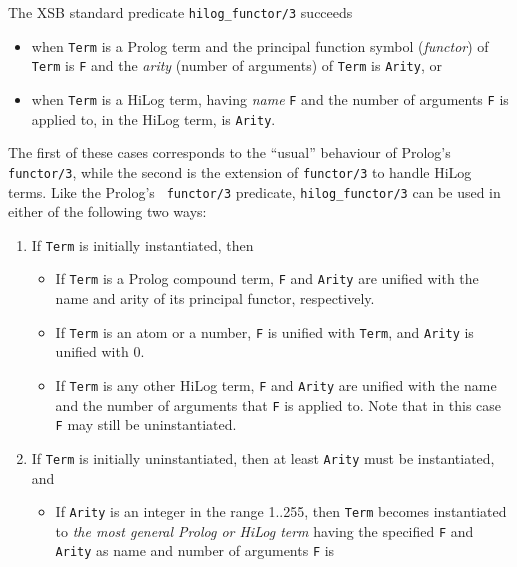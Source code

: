 \begin{description}
%
    The XSB standard predicate {\tt hilog\_functor/3} succeeds 
    \begin{itemize}
    \item when {\tt Term} is a Prolog term and the principal function 
          symbol ({\em functor}) of {\tt Term} is {\tt F} and the
          {\em arity} (number of arguments) of {\tt Term} is 
          {\tt Arity}, or
    \item when {\tt Term} is a HiLog term, having {\em name} {\tt F} 
          and the number of arguments {\tt F} is applied to, in the 
          HiLog term, is {\tt Arity}.
    \end{itemize}
    The first of these cases corresponds to the ``usual'' behaviour of
    Prolog's {\tt functor/3}, while the second is the extension of
    {\tt functor/3} to handle HiLog terms. Like the Prolog's {\tt
    functor/3} predicate, {\tt hilog\_functor/3} can be used in either
    of the following two ways:
    \begin{enumerate}
    \item If {\tt Term} is initially instantiated, then
          \begin{itemize}
          \item If {\tt Term} is a Prolog compound term, {\tt F} and 
                {\tt Arity} are unified with the name and arity of 
                its principal functor, respectively.
          \item If {\tt Term} is an atom or a number, {\tt F} is unified 
                with {\tt Term}, and {\tt Arity} is unified with 0.
          \item If {\tt Term} is any other HiLog term, {\tt F} and {\tt Arity} 
                are unified with the name and the number of arguments 
                that {\tt F} is applied to. Note that in this case {\tt F}
                may still be uninstantiated.
          \end{itemize}
    \item If {\tt Term} is initially uninstantiated, then at least
          {\tt Arity} must be instantiated, and
          \begin{itemize}
          \item If {\tt Arity} is an integer in the range 1..255, then
                {\tt Term} becomes instantiated to {\em the most general 
                Prolog or HiLog term} having the specified {\tt F} and 
                {\tt Arity} as name and number of arguments {\tt F} is 

\end{itemize}
\end{enumerate}
\end{description}
